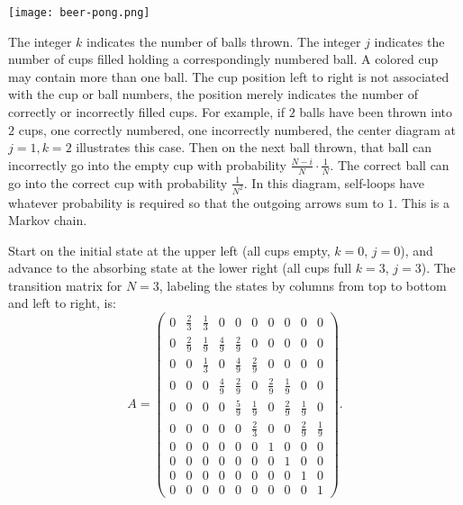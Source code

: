 \documentclass[12pt]{article}
\begin{document}
\begin{solution}
\begin{enumerate}[label=(\alph*)]
        \texttt{[image: beer-pong.png]}

        The integer \( k \) indicates the number of balls thrown.  The
        integer \( j \) indicates the number of cups filled holding a
        correspondingly numbered ball.  A colored cup may contain more
        than one ball.  The cup position left to right is not associated
        with the cup or ball numbers, the position merely indicates the
        number of correctly or incorrectly filled cups.  For example, if
        \( 2 \) balls have been thrown into \( 2 \) cups, one correctly
        numbered, one incorrectly numbered, the center diagram at \(
        j=1, k=2 \) illustrates this case.  Then on the next ball
        thrown, that ball can incorrectly go into the empty cup with
        probability \( \frac{N-i}{N} \cdot \frac{1}{N} \). The correct
        ball can go into the correct cup with probability \( \frac{1}{N^2}
        \).  In this diagram, self-loops have whatever probability is
        required so that the outgoing arrows sum to \( 1 \). This is a
        Markov chain.

        Start on the initial state at the upper left (all cups empty, \(
        k=0 \), \( j=0 \)), and advance to the absorbing state at the
        lower right (all cups full \( k=3 \), \( j=3 \)).  The
        transition matrix for \( N=3 \), labeling the states by columns
        from top to bottom and left to right, is:
        \[
            A =
            \begin{pmatrix}
                0 & \frac{2}{3} & \frac{1}{3} & 0 & 0 & 0 & 0 & 0 & 0 &
                0\\
                0 & \frac{2}{9} & \frac{1}{9} & \frac{4}{9} & \frac{2}{9}
                & 0 & 0 & 0 & 0 & 0\\
                0 & 0 & \frac{1}{3} & 0 & \frac{4}{9} & \frac{2}{9} & 0
                & 0 & 0 & 0\\
                0 & 0 & 0 & \frac{4}{9} & \frac{2}{9} & 0 & \frac{2}{9}
                & \frac{1}{9} & 0 & 0\\
                0 & 0 & 0 & 0 & \frac{5}{9} & \frac{1}{9} & 0 & \frac{2}
                {9} & \frac{1}{9} & 0\\
                0 & 0 & 0 & 0 & 0 & \frac{2}{3} & 0 & 0 & \frac{2}{9} &
                \frac{1}{9}\\
                0 & 0 & 0 & 0 & 0 & 0 & 1 & 0 & 0 & 0\\
                0 & 0 & 0 & 0 & 0 & 0 & 0 & 1 & 0 & 0\\
                0 & 0 & 0 & 0 & 0 & 0 & 0 & 0 & 1 & 0\\
                0 & 0 & 0 & 0 & 0 & 0 & 0 & 0 & 0 & 1
            \end{pmatrix}
            .
        \]


\end{enumerate}
\end{solution}
\end{document}
